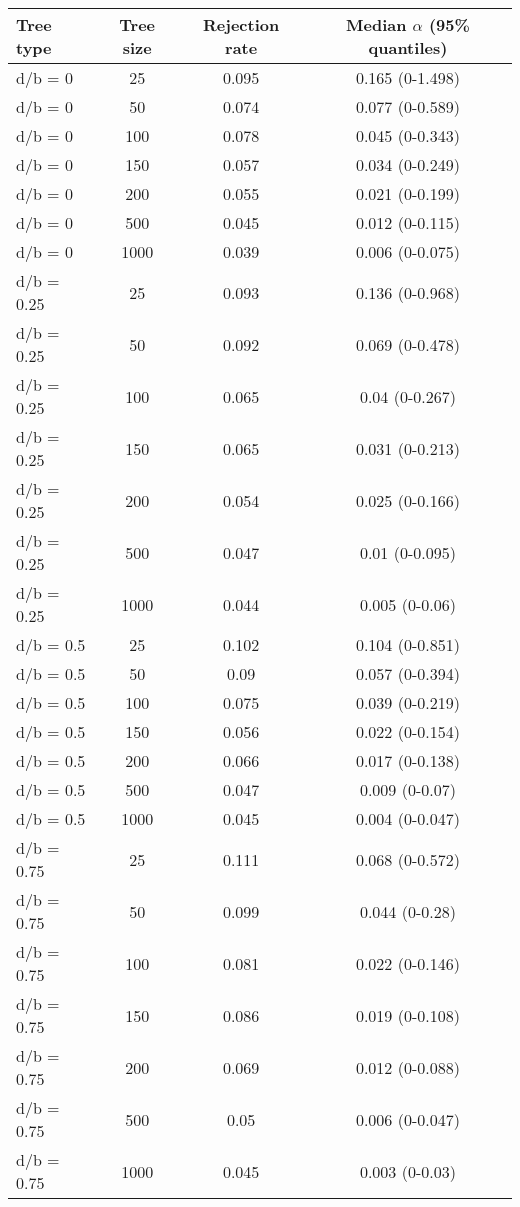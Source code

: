 \begin{tabular}{lccc}
     \hline
     \textbf{Tree type} & \textbf{Tree size} & \textbf{Rejection rate}  & \textbf{Median $\alpha$ (95\% quantiles)}    \\
     \hline
     d/b = 0 & 25  & 0.095 & 0.165 (0-1.498)   \\
     d/b = 0 & 50  & 0.074 & 0.077 (0-0.589)   \\
     d/b = 0 & 100 & 0.078 & 0.045 (0-0.343)   \\
     d/b = 0 & 150 & 0.057 & 0.034 (0-0.249)   \\
     d/b = 0 & 200 & 0.055 & 0.021 (0-0.199)   \\
     d/b = 0 & 500 & 0.045 & 0.012 (0-0.115)   \\
     d/b = 0 & 1000  & 0.039 & 0.006 (0-0.075)   \\
     d/b = 0.25  & 25  & 0.093 & 0.136 (0-0.968)   \\
     d/b = 0.25  & 50  & 0.092 & 0.069 (0-0.478)   \\
     d/b = 0.25  & 100 & 0.065 & 0.04 (0-0.267)    \\
     d/b = 0.25  & 150 & 0.065 & 0.031 (0-0.213)   \\
     d/b = 0.25  & 200 & 0.054 & 0.025 (0-0.166)   \\
     d/b = 0.25  & 500 & 0.047 & 0.01 (0-0.095)    \\
     d/b = 0.25  & 1000  & 0.044 & 0.005 (0-0.06)    \\
     d/b = 0.5 & 25  & 0.102 & 0.104 (0-0.851)   \\
     d/b = 0.5 & 50  & 0.09  & 0.057 (0-0.394)   \\
     d/b = 0.5 & 100 & 0.075 & 0.039 (0-0.219)   \\
     d/b = 0.5 & 150 & 0.056 & 0.022 (0-0.154)   \\
     d/b = 0.5 & 200 & 0.066 & 0.017 (0-0.138)   \\
     d/b = 0.5 & 500 & 0.047 & 0.009 (0-0.07)    \\
     d/b = 0.5 & 1000  & 0.045 & 0.004 (0-0.047)   \\
     d/b = 0.75  & 25  & 0.111 & 0.068 (0-0.572)   \\
     d/b = 0.75  & 50  & 0.099 & 0.044 (0-0.28)    \\
     d/b = 0.75  & 100 & 0.081 & 0.022 (0-0.146)   \\
     d/b = 0.75  & 150 & 0.086 & 0.019 (0-0.108)   \\
     d/b = 0.75  & 200 & 0.069 & 0.012 (0-0.088)   \\
     d/b = 0.75  & 500 & 0.05  & 0.006 (0-0.047)   \\
     d/b = 0.75  & 1000  & 0.045 & 0.003 (0-0.03)    \\
     \hline
\end{tabular}